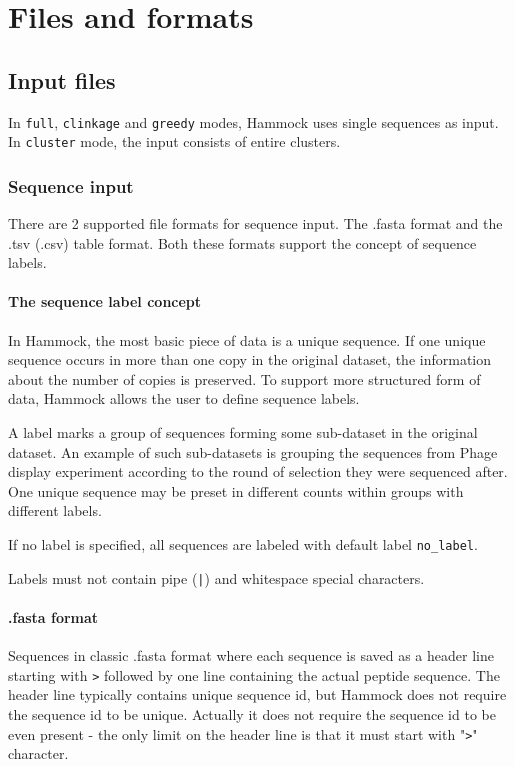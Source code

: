 \documentclass[11pt, a4paper, twoside, titlepage]{article}
\begin{document}
\section{Files and formats}
\label{filesandformats}
\subsection{Input files}
\label{inputfiles}
In \texttt{full}, \texttt{clinkage} and \texttt{greedy} modes, Hammock uses single sequences as input. In \texttt{cluster} mode, the input consists of entire clusters.

\subsubsection{Sequence input}
There are 2 supported file formats for sequence input. The .fasta format and the .tsv (.csv) table format. Both these formats support the concept of sequence labels. 

\paragraph{The sequence label concept} \label{labelConcept} In Hammock, the most basic piece of data is a unique sequence. If one unique sequence occurs in more than one copy in the original dataset, the information about the number of copies is preserved. To support more structured form of data, Hammock allows the user to define sequence labels. 

A label marks a group of sequences forming some sub-dataset in the original dataset. An example of such sub-datasets is grouping the sequences from Phage display experiment according to the round of selection they were sequenced after. One unique sequence may be preset in different counts within groups with different labels. 

If no label is specified, all sequences are labeled with default label \texttt{no\_label}.

Labels must not contain pipe (\texttt{|}) and whitespace special characters.

\paragraph{.fasta format}\label{fastaFormat}
Sequences in classic .fasta format where each sequence is saved as a header line starting with \texttt{>} followed by one line containing the actual peptide sequence. The header line typically contains unique sequence id, but Hammock does not require the sequence id to be unique. Actually it does not require the sequence id to be even present - the only limit on the header line is that it must start with "\texttt{>}" character.
\end{document}
